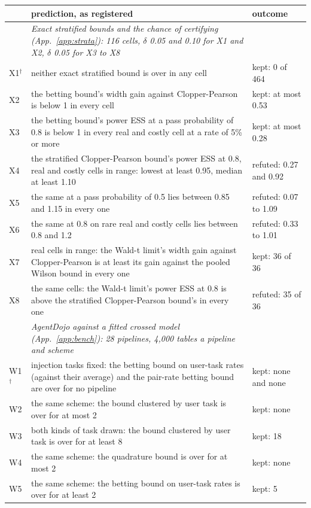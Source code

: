 \begin{tabular}{@{}l p{7.4cm} p{7.4cm}@{}}
\toprule
 & \textbf{prediction, as registered} & \textbf{outcome} \\
\midrule
 & \emph{Exact stratified bounds and the chance of certifying (App.~\ref{app:strata}): 116 cells, $\delta$ 0.05 and 0.10 for X1 and X2, $\delta$ 0.05 for X3 to X8} &  \\
X1$^\dagger$ & neither exact stratified bound is over in any cell & kept: 0 of 464 \\
X2 & the betting bound's width gain against Clopper-Pearson is below 1 in every cell & kept: at most 0.53 \\
X3 & the betting bound's power ESS at a pass probability of 0.8 is below 1 in every real and costly cell at a rate of 5\% or more & kept: at most 0.28 \\
X4 & the stratified Clopper-Pearson bound's power ESS at 0.8, real and costly cells in range: lowest at least 0.95, median at least 1.10 & refuted: 0.27 and 0.92 \\
X5 & the same at a pass probability of 0.5 lies between 0.85 and 1.15 in every one & refuted: 0.07 to 1.09 \\
X6 & the same at 0.8 on rare real and costly cells lies between 0.8 and 1.2 & refuted: 0.33 to 1.01 \\
X7 & real cells in range: the Wald-t limit's width gain against Clopper-Pearson is at least its gain against the pooled Wilson bound in every one & kept: 36 of 36 \\
X8 & the same cells: the Wald-t limit's power ESS at 0.8 is above the stratified Clopper-Pearson bound's in every one & refuted: 35 of 36 \\
 & \emph{AgentDojo against a fitted crossed model (App.~\ref{app:bench}): 28 pipelines, 4,000 tables a pipeline and scheme} &  \\
W1$^\dagger$ & injection tasks fixed: the betting bound on user-task rates (against their average) and the pair-rate betting bound are over for no pipeline & kept: none and none \\
W2 & the same scheme: the bound clustered by user task is over for at most 2 & kept: none \\
W3 & both kinds of task drawn: the bound clustered by user task is over for at least 8 & kept: 18 \\
W4 & the same scheme: the quadrature bound is over for at most 2 & kept: none \\
W5 & the same scheme: the betting bound on user-task rates is over for at least 2 & kept: 5 \\

\end{tabular}
